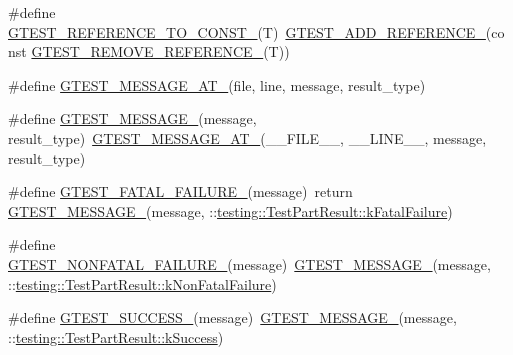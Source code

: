 \begin{DoxyCompactItemize}
\item 
\#define \hyperlink{gtest-internal_8h_a9f91fcd24cae0b48fdaeb19102dac525}{G\+T\+E\+S\+T\+\_\+\+R\+E\+F\+E\+R\+E\+N\+C\+E\+\_\+\+T\+O\+\_\+\+C\+O\+N\+S\+T\+\_\+}(T)~\hyperlink{gtest-internal_8h_ab389953fc1f7e4efae30d182a0e0a13b}{G\+T\+E\+S\+T\+\_\+\+A\+D\+D\+\_\+\+R\+E\+F\+E\+R\+E\+N\+C\+E\+\_\+}(const \hyperlink{gtest-internal_8h_a84c72f25a6a6600e3ff8381ca6982ae9}{G\+T\+E\+S\+T\+\_\+\+R\+E\+M\+O\+V\+E\+\_\+\+R\+E\+F\+E\+R\+E\+N\+C\+E\+\_\+}(T))
\item 
\#define \hyperlink{gtest-internal_8h_a8d70025c45a47a493780746dfd66d565}{G\+T\+E\+S\+T\+\_\+\+M\+E\+S\+S\+A\+G\+E\+\_\+\+A\+T\+\_\+}(file,  line,  message,  result\+\_\+type)
\item 
\#define \hyperlink{gtest-internal_8h_a94c73d5368ec946bc354d0992ad00810}{G\+T\+E\+S\+T\+\_\+\+M\+E\+S\+S\+A\+G\+E\+\_\+}(message,  result\+\_\+type)~\hyperlink{gtest-internal_8h_a8d70025c45a47a493780746dfd66d565}{G\+T\+E\+S\+T\+\_\+\+M\+E\+S\+S\+A\+G\+E\+\_\+\+A\+T\+\_\+}(\+\_\+\+\_\+\+F\+I\+L\+E\+\_\+\+\_\+, \+\_\+\+\_\+\+L\+I\+N\+E\+\_\+\+\_\+, message, result\+\_\+type)
\item 
\#define \hyperlink{gtest-internal_8h_a0f9a4c3ea82cc7bf4478eaffdc168358}{G\+T\+E\+S\+T\+\_\+\+F\+A\+T\+A\+L\+\_\+\+F\+A\+I\+L\+U\+R\+E\+\_\+}(message)~return \hyperlink{gtest-internal_8h_a94c73d5368ec946bc354d0992ad00810}{G\+T\+E\+S\+T\+\_\+\+M\+E\+S\+S\+A\+G\+E\+\_\+}(message, \+::\hyperlink{classtesting_1_1TestPartResult_a65ae656b33fdfdfffaf34858778a52d5ae1bf0b610b697a43fee97628cdab4ea1}{testing\+::\+Test\+Part\+Result\+::k\+Fatal\+Failure})
\item 
\#define \hyperlink{gtest-internal_8h_a6cb7482cfa03661a91c698eb5895f642}{G\+T\+E\+S\+T\+\_\+\+N\+O\+N\+F\+A\+T\+A\+L\+\_\+\+F\+A\+I\+L\+U\+R\+E\+\_\+}(message)~\hyperlink{gtest-internal_8h_a94c73d5368ec946bc354d0992ad00810}{G\+T\+E\+S\+T\+\_\+\+M\+E\+S\+S\+A\+G\+E\+\_\+}(message, \+::\hyperlink{classtesting_1_1TestPartResult_a65ae656b33fdfdfffaf34858778a52d5a00a755614f8ec3f78b2e951f8c91cd92}{testing\+::\+Test\+Part\+Result\+::k\+Non\+Fatal\+Failure})
\item 
\#define \hyperlink{gtest-internal_8h_abe012b550eb3807e8c49f7e161bd1567}{G\+T\+E\+S\+T\+\_\+\+S\+U\+C\+C\+E\+S\+S\+\_\+}(message)~\hyperlink{gtest-internal_8h_a94c73d5368ec946bc354d0992ad00810}{G\+T\+E\+S\+T\+\_\+\+M\+E\+S\+S\+A\+G\+E\+\_\+}(message, \+::\hyperlink{classtesting_1_1TestPartResult_a65ae656b33fdfdfffaf34858778a52d5a8fa3d06b2baad8bf7c1f17dea314983e}{testing\+::\+Test\+Part\+Result\+::k\+Success})
\item 

\end{DoxyCompactItemize}

